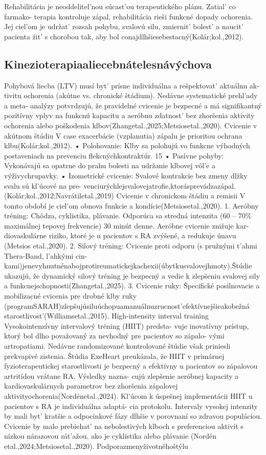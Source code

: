 Rehabilitácia je neoddelitel’nou súcast’ou terapeutického plánu. Zatial’ co farmako- terapia kontroluje zápal, rehabilitácia rieši funkcné dopady ochorenia. Jej ciel’om je udržat’ rozsah pohybu, svalovú silu, zmiernit’ bolest’ a naucit’ pacienta žit’ s chorobou tak, aby bol conajdlhšiesebestacný(Kolár;kol.,2012).


\subsection{Kinezioterapiaaliecebnátelesnávýchova}

Pohybová liecba (LTV) musí byt’ prísne individuálna a rešpektovat’ aktuálnu ak- tivitu ochorenia (akútne vs. chronické štádium). Nedávne systematické prehl’ady a meta- analýzy potvrdzujú, že pravidelné cvicenie je bezpecné a má signifikantný pozitívny vplyv na funkcnú kapacitu a aeróbnu zdatnost’ bez zhoršenia aktivity ochorenia alebo poškodenia klbov(Zhangetal.,2025;Metsiosetal.,2020). Cvicenie v akútnom štádiu V case exacerbácie (vzplanutia) zápalu je prioritou ochrana klbu(Kolár;kol.,2012). • Polohovanie: Klby sa polohujú vo funkcne výhodných postaveniach na prevenciu flekcnýchkontraktúr. 15 • Pasívne pohyby: Vykonávajú sa opatrne do prahu bolesti na udržanie klbovej vôl’e a výživychrupavky. • Izometrické cvicenie: Svalové kontrakcie bez zmeny dlžky svalu sú kl’úcové na pre- venciurýchlejsvalovejatrofie,ktorásprevádzazápal. (Kolár;kol.,2012;Navrátiletal.,2019) Cvicenie v chronickom štádiu a remisii V tomto období je ciel’om obnova funkcie a kondície(Metsiosetal.,2020). 1. Aeróbny tréning: Chôdza, cyklistika, plávanie. Odporúca sa stredná intenzita (60 -- 70\% maximálnej tepovej frekvencie) 30 minút denne. Aeróbne cvicenie znižuje kar- diovaskulárne riziko, ktoré je u pacientov s RA zvýšené, a redukuje únavu (Metsios etal.,2020). 2. Silový tréning: Cvicenie proti odporu (s pružnými t’ahmi Thera-Band, l’ahkými cin- kami)jenevyhnutnénabojprotireumatickejkachexii(úbytkusvalovejhmoty).Štúdie ukazujú, že dynamický silový tréning je bezpecný a vedie k zlepšeniu svalovej sily a funkcnejschopnosti(Zhangetal.,2025). 3. Cvicenie ruky: Špecifické posilnovacie a mobilizacné cvicenia pre drobné klby ruky (programSARAH)zlepšujúsiluúchopuamanuálnuzrucnost’efektívnejšieakobežná starostlivost’(Williamsetal.,2015). High-intensity interval training Vysokointenzívny intervalový tréning (HIIT) predsta- vuje inovatívny prístup, ktorý bol dlho považovaný za nevhodný pre pacientov so zápalo- vými artropatiami. Nedávne randomizované kontrolované štúdie však priniesli prekvapivé zistenia. Štúdia ExeHeart preukázala, že HIIT v primárnej fyzioterapeutickej starostlivosti je bezpecný a efektívny u pacientov so zápalovou artritídou vrátane RA. Výsledky nazna- cujú zlepšenie aeróbnej kapacity a kardiovaskulárnych parametrov bez zhoršenia zápalovej aktivityochorenia(Nordénetal.,2024). Kl’úcom k úspešnej implementácii HIIT u pacientov s RA je individuálna adaptá- cia protokolu. Intervaly vysokej intenzity by mali byt’ kratšie a odpocinkové fázy dlhšie v porovnaní so zdravou populáciou. Cvicenie by malo prebiehat’ na nebolestivých klboch s preferenciou aktivít s nízkou nárazovou zát’ažou, ako je cyklistika alebo plávanie (Nordén etal.,2024;Metsiosetal.,2020). Podporazmenyživotnéhoštýlu 
